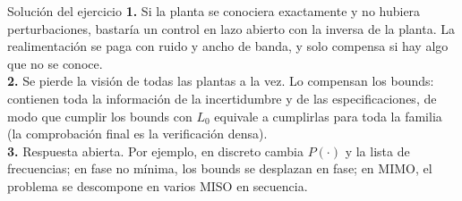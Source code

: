 \documentclass[aspectratio=169,11pt]{beamer}
\begin{document}
\appendix
\begin{frame}{Solución del ejercicio}
  \footnotesize
  \textbf{1.} Si la planta se conociera exactamente y no hubiera perturbaciones, bastaría un control en lazo abierto con la inversa de la planta. La realimentación se paga con ruido y ancho de banda, y solo compensa si hay algo que no se conoce.\\[3pt]
  \textbf{2.} Se pierde la visión de todas las plantas a la vez. Lo compensan los bounds: contienen toda la información de la incertidumbre y de las especificaciones, de modo que cumplir los bounds con $L_0$ equivale a cumplirlas para toda la familia (la comprobación final es la verificación densa).\\[3pt]
  \textbf{3.} Respuesta abierta. Por ejemplo, en discreto cambia $P(\cdot)$ y la lista de frecuencias; en fase no mínima, los bounds se desplazan en fase; en MIMO, el problema se descompone en varios MISO en secuencia.
\end{frame}
\end{document}
